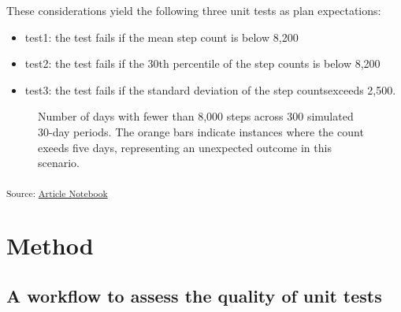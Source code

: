 \documentclass[
]{jds}
\providecommand{\tightlist}{%
  \setlength{\itemsep}{0pt}\setlength{\parskip}{0pt}}\usepackage{longtable,booktabs,array}
\begin{document}
These considerations yield the following three unit tests as plan
expectations:

\begin{itemize}
\tightlist
\item
  test1: the test fails if the mean step count is below 8,200
\item
  test2: the test fails if the 30th percentile of the step counts is
  below 8,200
\item
  test3: the test fails if the standard deviation of the step
  countsexceeds 2,500.
\end{itemize}

\label{cell-fig-step-count}
\begin{figure}[H]


\caption{\label{fig-step-count}Number of days with fewer than 8,000
steps across 300 simulated 30-day periods. The orange bars indicate
instances where the count exeeds five days, representing an unexpected
outcome in this scenario.}

\end{figure}%

\textsubscript{Source:
\href{https://huizezhang-sherry.github.io/paper-analysis-plan/index.qmd.html}{Article
Notebook}}

\section{Method}\label{method}

\subsection{A workflow to assess the quality of unit
tests}\label{a-workflow-to-assess-the-quality-of-unit-tests}
\end{document}
